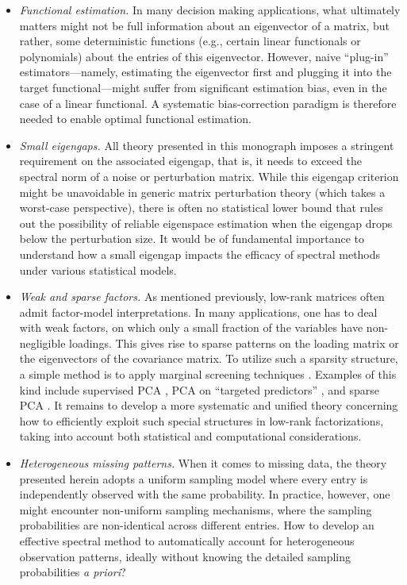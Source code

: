 \begin{itemize}
	\item {\em Functional estimation.} In many decision making applications, what ultimately matters might not be full information about an eigenvector of a matrix, but rather, some deterministic functions (e.g., certain linear functionals or polynomials) about the entries of this eigenvector. However, naive ``plug-in'' estimators---namely, estimating the eigenvector first and plugging it into the target functional---might suffer from significant estimation bias, even in the case of a linear functional.  A systematic bias-correction paradigm is therefore needed to enable optimal functional estimation.

		

	\item {\em Small eigengaps.} All theory presented in this monograph imposes a stringent requirement on the associated eigengap, that is, it  needs to exceed the spectral norm of a noise or perturbation matrix.  While this eigengap criterion might be unavoidable in generic matrix perturbation theory (which takes a worst-case perspective), there is often no statistical lower bound that rules out the possibility of reliable eigenspace estimation when the eigengap drops below the perturbation size.
		It would be of fundamental importance to understand how a small eigengap impacts the efficacy of spectral methods under various statistical models.

  \item {\em Weak and sparse factors.}  As mentioned previously, low-rank matrices often admit factor-model interpretations.  
In many applications, one has to deal with weak factors, on which only a small fraction of the variables have non-negligible loadings.  
This gives rise to sparse patterns on the loading matrix or the eigenvectors of the covariance matrix. To utilize such a sparsity structure,  a simple method is to apply marginal screening techniques \citep{fan2008sure,fan2008high}.  Examples of this kind include supervised PCA \citep{bair2006prediction},    PCA on ``targeted predictors'' \citep{bai2008forecasting}, and sparse PCA \citep{zou2006sparse,JohLu09,ma2013sparse}. It remains to develop a more systematic and unified theory concerning how to efficiently exploit such
 special structures in low-rank factorizations, taking into account both statistical and computational considerations.
  	

	\item {\em Heterogeneous missing patterns.} When it comes to missing data, the theory presented herein adopts a uniform sampling model where every entry is independently observed with the same probability. In practice, however, one might encounter non-uniform sampling mechanisms, where the sampling probabilities are non-identical across different entries. How to develop an effective spectral method to automatically account for heterogeneous observation patterns, ideally without knowing the detailed sampling probabilities {\em a priori}?




\end{itemize}
